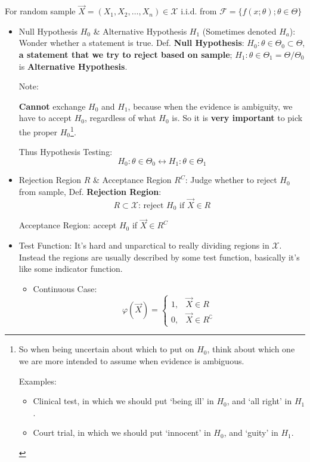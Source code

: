     For random sample $\vec{X}=(X_1,X_2,\ldots,X_n)\in\mathscr{X}$ i.i.d. from $\mathscr{F}=\{f(x;\theta);\theta\in\Theta\}$
    \begin{itemize}[topsep = -3 pt]
        \item Null Hypothesis $H_0$ \& Alternative Hypothesis $H_1$ (Sometimes denoted $ H_a $): Wonder whether a statement is true. Def. \textbf{Null Hypothesis}: $H_0:\theta\in\Theta_0\subset\Theta$, \textbf{a statement that we try to reject based on sample}; $H_1:\theta\in\Theta_1=\Theta/\Theta_0$ is \textbf{Alternative Hypothesis}.
        
    \begin{point}
        Note: 
    \end{point}
    \textbf{Cannot} exchange $ H_0 $ and $ H_1 $, because when the evidence is ambiguity, we have to accept $ H_0 $, regardless of what $ H_0 $ is. So it is \textbf{very important} to pick the proper $ H_0 $\footnote{So when being uncertain about which to put on $ H_0 $, think about which one we are more intended to assume when evidence is ambiguous.
    
    Examples: 
    \begin{itemize}[topsep=2pt,itemsep=0pt]
        \item Clinical test, in which we should put `being ill' in $ H_0 $, and `all right' in $ H_1 $.
        \item Court trial, in which we should put `innocent' in $ H_0 $, and `guity' in $ H_1 $.
    \end{itemize}
    
        }. 


        Thus Hypothesis Testing:
        \begin{equation}
            H_0:\theta\in\Theta_0\longleftrightarrow H_1:\theta\in\Theta_1
        \end{equation}
        
        \item Rejection Region $R$ \& Acceptance Region $R^C$: Judge whether to reject $H_0$ from sample, Def. \textbf{Rejection Region}:
        \begin{equation}R\subset\mathscr{X}\text{: reject } H_0 \text{ if } \vec{X}\in R\end{equation}

        Acceptance Region: accept $H_0$ if $\vec{X}\in R^C$
        \item Test Function: It's hard and unparctical to really dividing regions in $ \mathscr{X} $. Instead the regions are usually described by some test function, basically it's like some indicator function.
        \begin{itemize}
            \item Continuous Case:
        \begin{equation}
            \varphi(\vec{X})=\begin{cases}
                1,&\vec{X}\in R\\
                0,&\vec{X}\in R^\complement
            \end{cases}
        \end{equation}


\end{itemize}
\end{itemize}
